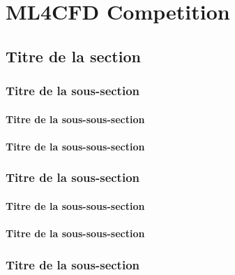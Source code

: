 \chapter{ML4CFD Competition} %


\section{Titre de la section}
\subsection{Titre de la sous-section}

\cite{Faulkes2013}
\subsubsection{Titre de la sous-sous-section}
\subsubsection{Titre de la sous-sous-section}


\subsection{Titre de la sous-section}

\subsubsection{Titre de la sous-sous-section}

\subsubsection{Titre de la sous-sous-section}

\subsection{Titre de la sous-section}


